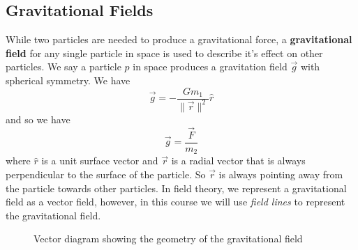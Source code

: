 \subsection{Gravitational Fields}

While two particles are needed to produce a gravitational force, a \textbf{gravitational field} for any single particle in space is used to describe it's effect on other particles. We say a particle $p$ in space produces a gravitation field $\vec{g}$ with spherical symmetry. We have
\begin{equation}
    \label{eq:gravitational-field-1}
    \vec{g} = - \frac{Gm_1}{\| \vec{r} \|^2} \hat{r}
\end{equation}
and so we have
\begin{equation}
    \label{eq:gravitational-field-2}
    \vec{g} = \frac{\vec{F}}{m_2}
\end{equation}
where $\hat{r}$ is a unit surface vector and $\vec{r}$ is a radial vector that is always perpendicular to the surface of the particle. So $\vec{r}$ is always pointing away from the particle towards other particles. In field theory, we represent a gravitational field as a vector field, however, in this course we will use \textit{field lines} to represent the gravitational field.

\begin{figure}[h!]
    \centering
    \caption{Vector diagram showing the geometry of the gravitational field}
\end{figure}
\FloatBarrier

